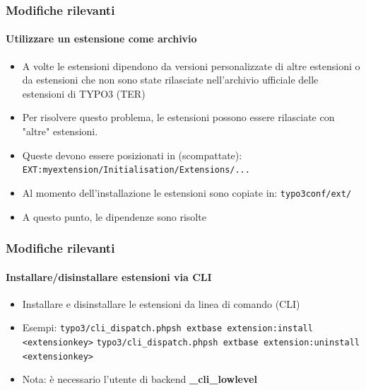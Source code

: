 
\begin{frame}[fragile]
	\frametitle{Modifiche rilevanti}
	\framesubtitle{Utilizzare un estensione come archivio}

	\begin{itemize}
		\item A volte le estensioni dipendono da versioni personalizzate di altre estensioni o da estensioni che non sono state rilasciate nell'archivio ufficiale delle estensioni di TYPO3 (TER)
		\item Per risolvere questo problema, le estensioni possono essere rilasciate con "altre" estensioni.
		\item Queste devono essere posizionati in (scompattate):\newline
			\texttt{EXT:myextension/Initialisation/Extensions/...}

		\item Al momento dell'installazione le estensioni sono copiate in:\newline
			\texttt{typo3conf/ext/}

		\item A questo punto, le dipendenze sono risolte

	\end{itemize}

\end{frame}


\begin{frame}[fragile]
	\frametitle{Modifiche rilevanti}
	\framesubtitle{Installare/disinstallare estensioni via CLI}

	\begin{itemize}
		\item Installare e disinstallare le estensioni da linea di comando (CLI)
		\item Esempi:
			\lstinline!typo3/cli_dispatch.phpsh extbase extension:install <extensionkey>!
			\lstinline!typo3/cli_dispatch.phpsh extbase extension:uninstall <extensionkey>!

		\item Nota: è necessario l'utente di backend \textbf{\_cli\_lowlevel}
	\end{itemize}

\end{frame}

